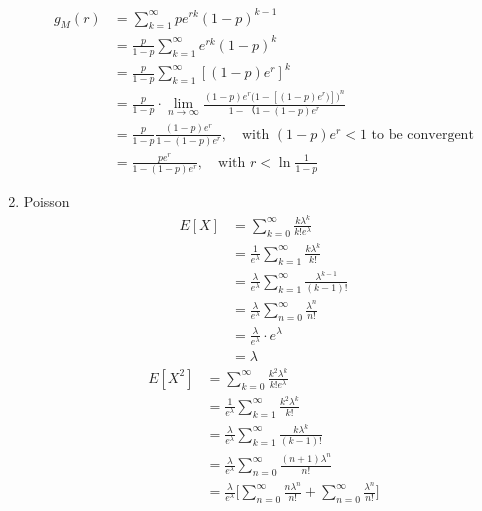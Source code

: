 \documentclass[UTF8]{article}
\begin{document}
\begin{enumerate}
        \begin{equation*}
            \begin{split}
                g_M(r) &= \sum^\infty_{k=1}pe^{rk}(1-p)^{k-1}\\
                &=\frac{p}{1-p}\sum^\infty_{k=1}e^{rk}(1-p)^{k}\\
                &=\frac{p}{1-p}\sum^\infty_{k=1}[(1-p)e^r]^k\\
                &=\frac{p}{1-p}\cdot\lim_{n\rightarrow\infty}\frac{(1-p)e^r\big(1-[(1-p)e^r)]\big)^n}{1-（1-(1-p)e^r}\\
                &=\frac{p}{1-p}\frac{(1-p)e^r}{1-(1-p)e^r},\quad\text{with $(1-p)e^r<1$ to be convergent}\\
                &=\frac{pe^r}{1-(1-p)e^r},\quad\text{with $r<\ln\frac{1}{1-p}$}
            \end{split}            
        \end{equation*}
        \item Poisson
            \begin{equation*}
                \begin{split}
                    E[X] &= \sum^\infty_{k=0}\frac{k\lambda^k}{k!e^\lambda}\\
                    &=\frac{1}{e^\lambda}\sum^\infty_{k=1}\frac{k\lambda^k}{k!}\\
                    &=\frac{\lambda}{e^\lambda}\sum^\infty_{k=1}\frac{\lambda^{k-1}}{(k-1)!}\\
                    &=\frac{\lambda}{e^\lambda}\sum^\infty_{n=0}\frac{\lambda^n}{n!}\\
                    &=\frac{\lambda}{e^\lambda}\cdot e^\lambda\\
                    &=\lambda
                \end{split}
            \end{equation*}
            \begin{equation*}
                \begin{split}
                    E[X^2] &=\sum^\infty_{k=0}\frac{k^2\lambda^k}{k!e^\lambda}\\
                    &=\frac{1}{e^\lambda}\sum^\infty_{k=1}\frac{k^2\lambda^k}{k!}\\
                    &=\frac{\lambda}{e^\lambda}\sum^\infty_{k=1}\frac{k\lambda^k}{(k-1)!}\\
                    &=\frac{\lambda}{e^\lambda}\sum^\infty_{n=0}\frac{(n+1)\lambda^n}{n!}\\
                    &=\frac{\lambda}{e^\lambda}\bigg[\sum^\infty_{n=0}\frac{n\lambda^n}{n!}+\sum^\infty_{n=0}\frac{\lambda^n}{n!}\bigg]\\

\end{split}
\end{equation*}
\end{enumerate}
\end{document}
